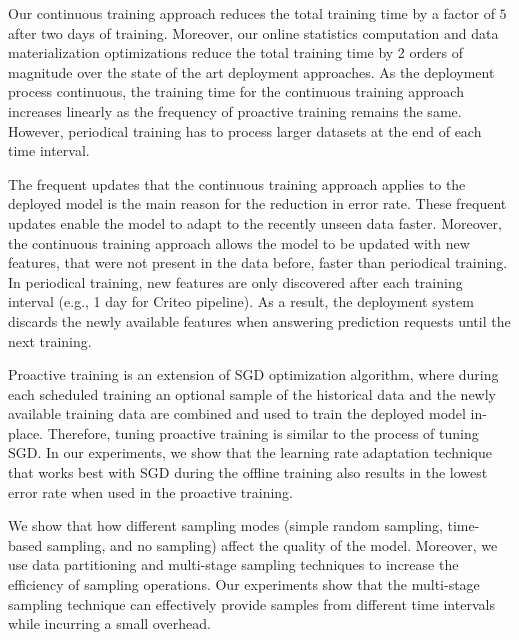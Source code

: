 Our continuous training approach reduces the total training time by a factor of $5$ after two days of training.
Moreover, our online statistics computation and data materialization optimizations reduce the total training time by 2 orders of magnitude over the state of the art deployment approaches.
As the deployment process continuous, the training time for the continuous training approach increases linearly as the frequency of proactive training remains the same.
However, periodical training has to process larger datasets at the end of each time interval.

The frequent updates that the continuous training approach applies to the deployed model is the main reason for the reduction in error rate.
These frequent updates enable the model to adapt to the recently unseen data faster.
Moreover, the continuous training approach allows the model to be updated with new features, that were not present in the data before, faster than periodical training.
In periodical training, new features are only discovered after each training interval (e.g., 1 day for Criteo pipeline).
As a result, the deployment system discards the newly available features when answering prediction requests until the next training.

Proactive training is an extension of SGD optimization algorithm, where during each scheduled training an optional sample of the historical data and the newly available training data are combined and used to train the deployed model in-place.
Therefore, tuning proactive training is similar to the process of tuning SGD.
In our experiments, we show that the learning rate adaptation technique that works best with SGD during the offline training also results in the lowest error rate when used in the proactive training.

We show that how different sampling modes (simple random sampling, time-based sampling, and no sampling) affect the quality of the model.
Moreover, we use data partitioning and multi-stage sampling techniques to increase the efficiency of sampling operations.
Our experiments show that the multi-stage sampling technique can effectively provide samples from different time intervals while incurring a small overhead.




